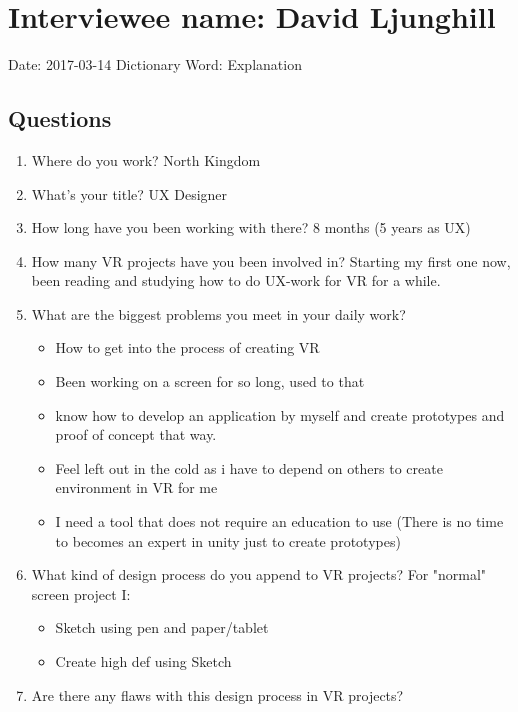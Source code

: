 \section{Interviewee name: David Ljunghill}
Date: 2017-03-14
Dictionary
Word: Explanation
\subsection{Questions}
\begin{enumerate}
\item Where do you work?
North Kingdom
\item What's your title?
UX Designer
\item How long have you been working with there?
8 months (5 years as UX)
\item How many VR projects have you been involved in?
Starting my first one now, been reading and studying how to do UX-work for VR for a while.
\item What are the biggest problems you meet in your daily work?
\begin{itemize}
  \item How to get into the process of creating VR
  \item Been working on a screen for so long, used to that
  \item know how to develop an application by myself and create prototypes and proof of concept that way.
  \item Feel left out in the cold as i have to depend on others to create environment in VR for me
  \item I need a tool that does not require an education to use (There is no time to becomes an expert in unity just to create prototypes)
\end{itemize}
\item What kind of design process do you append to VR projects?
For "normal" screen project I:
\begin{itemize}
  \item Sketch using pen and paper/tablet
  \item Create high def using Sketch
\end{itemize}
\item Are there any flaws with this design process in VR projects?
\begin{itemize}



\end{itemize}
\end{enumerate}
